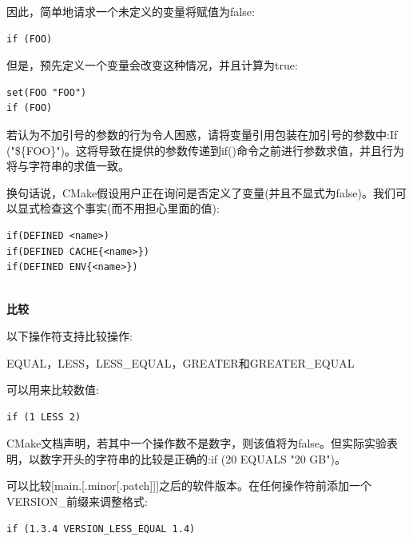 因此，简单地请求一个未定义的变量将赋值为false:

\begin{lstlisting}[style=styleCMake]
if (FOO)
\end{lstlisting}

但是，预先定义一个变量会改变这种情况，并且计算为true:

\begin{lstlisting}[style=styleCMake]
set(FOO "FOO")
if (FOO)
\end{lstlisting}

\begin{tcolorbox}[colback=blue!5!white,colframe=blue!75!black,title=Note]
若认为不加引号的参数的行为令人困惑，请将变量引用包装在加引号的参数中:If ("\$\{FOO\}")。这将导致在提供的参数传递到if()命令之前进行参数求值，并且行为将与字符串的求值一致。
\end{tcolorbox}

换句话说，CMake假设用户正在询问是否定义了变量(并且不显式为false)。我们可以显式检查这个事实(而不用担心里面的值):

\begin{lstlisting}[style=styleCMake]
if(DEFINED <name>)
if(DEFINED CACHE{<name>})
if(DEFINED ENV{<name>})
\end{lstlisting}

\hspace*{\fill} \\ %
\noindent
\textbf{比较}

以下操作符支持比较操作:

EQUAL，LESS，LESS\_EQUAL，GREATER和GREATER\_EQUAL

可以用来比较数值:

\begin{lstlisting}[style=styleCMake]
if (1 LESS 2)
\end{lstlisting}

\begin{tcolorbox}[colback=blue!5!white,colframe=blue!75!black,title=Note]
CMake文档声明，若其中一个操作数不是数字，则该值将为false。但实际实验表明，以数字开头的字符串的比较是正确的:if (20 EQUALS "20 GB")。
\end{tcolorbox}

可以比较[main.[.minor[.patch]]]之后的软件版本。在任何操作符前添加一个VERSION\_前缀来调整格式:

\begin{lstlisting}[style=styleCMake]
if (1.3.4 VERSION_LESS_EQUAL 1.4)
\end{lstlisting}

